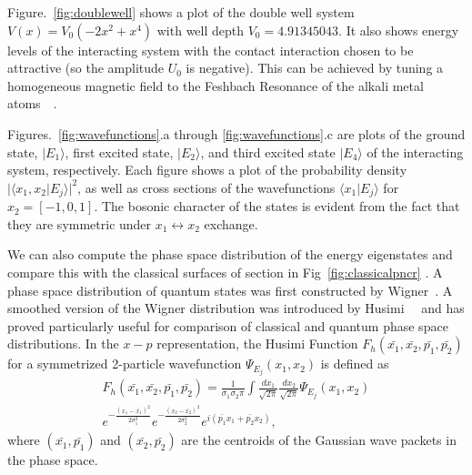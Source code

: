 Figure.~\ref{fig:doublewell} shows a plot of the double well system $V(x)=V_0 (-2 x^2+ x^4)$ with well depth $V_0=4.91345043$. It also shows energy levels of the interacting system with  the contact  interaction  chosen to be attractive (so the amplitude $U_0$ is negative). This can be achieved by tuning a homogeneous magnetic field to the Feshbach Resonance of the alkali metal atoms~\cite{feshbach:resonance}~\cite{pethick:bec}.

Figures.~\ref{fig:wavefunctions}.a through  \ref{fig:wavefunctions}.c are plots of the ground state, $|E_1\rangle$, first excited state, $|E_2\rangle$,  and third excited state $|E_4\rangle$ of the interacting system, respectively. Each figure shows a plot of the probability density $|\langle x_1,x_2|E_j\rangle|^2$, as well as cross sections of the wavefunctions $\langle x_1|E_j\rangle$ for $x_2=[-1,0,1]$. The bosonic character of the states is evident from the fact that they are symmetric under $x_1 \leftrightarrow x_2$ exchange. 

We can also compute the phase space distribution of the energy eigenstates and compare this with the classical surfaces of section in Fig~\ref{fig:classicalpncr} .  A phase space distribution of quantum states was first constructed by Wigner~\cite{wigner}.  A smoothed version of the Wigner distribution was introduced by Husimi~\cite{husimi}~\cite{Hillery:qdf} and has proved particularly useful for comparison of classical and quantum phase space distributions. 
In the $x-p$ representation, the Husimi Function $F_h(\bar{x_1},\bar{x_2},\bar{p_1},\bar{p_2})$ for a symmetrized 2-particle  wavefunction $\Psi_{E_j}(x_1,x_2)$ is defined as
%
\begin{multline}
F_h(\bar{x_1},\bar{x_2},\bar{p_1},\bar{p_2})=\frac{1}{\sigma_1 \sigma_2 \pi} \int \frac{dx_1}{\sqrt{2\pi}} \frac{dx_2}{\sqrt{2\pi}} \Psi_{E_j}(x_1,x_2) \\
e^{-\frac{(x_1-\bar{x_1})^2}{2\sigma^2_1}} e^{-\frac{(x_2-\bar{x_2})^2}{2\sigma^2_2}} e^{i (\bar{p_1}x_1 + \bar{p_2}x_2)},
\label{eq:husimi}
\end{multline}
%
where $(\bar{x_1},\bar{p_1})$ and $(\bar{x_2},\bar{p_2})$ are the centroids  of the Gaussian wave packets in the phase space.  

